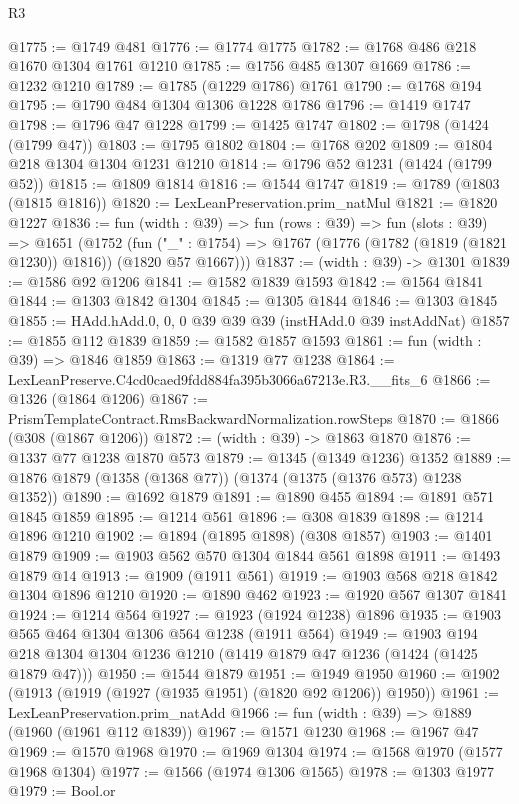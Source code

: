 \begin{lexlean}{R3}
\begin{coremodule}
@1775 := @1749 @481
@1776 := @1774 @1775
@1782 := @1768 @486 @218 @1670 @1304 @1761 @1210
@1785 := @1756 @485 @1307 @1669
@1786 := @1232 @1210
@1789 := @1785 (@1229 @1786) @1761
@1790 := @1768 @194
@1795 := @1790 @484 @1304 @1306 @1228 @1786
@1796 := @1419 @1747
@1798 := @1796 @47 @1228
@1799 := @1425 @1747
@1802 := @1798 (@1424 (@1799 @47))
@1803 := @1795 @1802
@1804 := @1768 @202
@1809 := @1804 @218 @1304 @1304 @1231 @1210
@1814 := @1796 @52 @1231 (@1424 (@1799 @52))
@1815 := @1809 @1814
@1816 := @1544 @1747
@1819 := @1789 (@1803 (@1815 @1816))
@1820 := LexLeanPreservation.prim_natMul
@1821 := @1820 @1227
@1836 := fun (width : @39) =>
  fun (rows : @39) =>
  fun (slots : @39) =>
  @1651
    (@1752
      (fun ("_" : @1754) => @1767 (@1776 (@1782 (@1819 (@1821 @1230)) @1816)) (@1820 @57 @1667)))
@1837 := (width : @39) -> @1301
@1839 := @1586 @92 @1206
@1841 := @1582 @1839 @1593
@1842 := @1564 @1841
@1844 := @1303 @1842 @1304
@1845 := @1305 @1844
@1846 := @1303 @1845
@1855 := HAdd.hAdd.{0, 0, 0} @39 @39 @39 (instHAdd.{0} @39 instAddNat)
@1857 := @1855 @112 @1839
@1859 := @1582 @1857 @1593
@1861 := fun (width : @39) => @1846 @1859
@1863 := @1319 @77 @1238
@1864 := LexLeanPreserve.C4cd0caed9fdd884fa395b3066a67213e.R3.__fits_6
@1866 := @1326 (@1864 @1206)
@1867 := PrismTemplateContract.RmsBackwardNormalization.rowSteps
@1870 := @1866 (@308 (@1867 @1206))
@1872 := (width : @39) -> @1863 @1870
@1876 := @1337 @77 @1238 @1870 @573
@1879 := @1345 (@1349 @1236) @1352
@1889 := @1876 @1879 (@1358 (@1368 @77)) (@1374 (@1375 (@1376 @573) @1238 @1352))
@1890 := @1692 @1879
@1891 := @1890 @455
@1894 := @1891 @571 @1845 @1859
@1895 := @1214 @561
@1896 := @308 @1839
@1898 := @1214 @1896 @1210
@1902 := @1894 (@1895 @1898) (@308 @1857)
@1903 := @1401 @1879
@1909 := @1903 @562 @570 @1304 @1844 @561 @1898
@1911 := @1493 @1879 @14
@1913 := @1909 (@1911 @561)
@1919 := @1903 @568 @218 @1842 @1304 @1896 @1210
@1920 := @1890 @462
@1923 := @1920 @567 @1307 @1841
@1924 := @1214 @564
@1927 := @1923 (@1924 @1238) @1896
@1935 := @1903 @565 @464 @1304 @1306 @564 @1238 (@1911 @564)
@1949 := @1903 @194 @218 @1304 @1304 @1236 @1210 (@1419 @1879 @47 @1236 (@1424 (@1425 @1879 @47)))
@1950 := @1544 @1879
@1951 := @1949 @1950
@1960 := @1902 (@1913 (@1919 (@1927 (@1935 @1951) (@1820 @92 @1206)) @1950))
@1961 := LexLeanPreservation.prim_natAdd
@1966 := fun (width : @39) => @1889 (@1960 (@1961 @112 @1839))
@1967 := @1571 @1230
@1968 := @1967 @47
@1969 := @1570 @1968
@1970 := @1969 @1304
@1974 := @1568 @1970 (@1577 @1968 @1304)
@1977 := @1566 (@1974 @1306 @1565)
@1978 := @1303 @1977
@1979 := Bool.or

\end{coremodule}
\end{lexlean}
